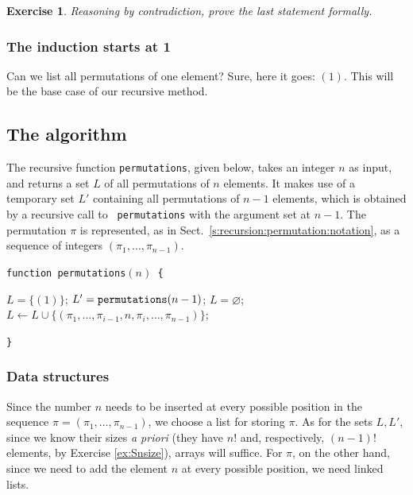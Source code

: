 \documentclass[a4paper]{book}
\theoremstyle{changebreak}                %
\newtheorem{ex}[result]{Exercise}
\begin{document}
\begin{ex}
Reasoning by contradiction, prove the last
statement formally. 
\end{ex}

\subsubsection{The induction starts at 1}
Can we list all permutations of one element? Sure, here it goes:
$(1)$. This will be the base case of our recursive method.

\subsection{The algorithm}
\label{a:permlist}
The recursive function {\tt permutations}, given below, takes an
integer $n$ as input, and returns a set $L$ of all
permutations of $n$ elements. It makes use of a
temporary set $L'$ containing all permutations of $n-1$ elements,
which is obtained by a recursive call to {\tt
  permutations} with the argument set at $n-1$. The permutation $\pi$
is represented, as in Sect.~\ref{s:recursion:permutation:notation}, as a
sequence of integers $(\pi_1,\ldots,\pi_{n-1})$.

\begin{minipage}{10cm}
\begin{flushleft}
{\tt function permutations$(n)$ \{} \\
\begin{algorithmic}[1]
  \STATE $L=\{(1)\}$;
\ELSE
  \STATE $L'=\mbox{\tt permutations}(n-1)$;\label{recstep}
  \STATE $L=\varnothing$;
   \label{for1}
      \STATE
      $L\leftarrow L\cup\{(\pi_1,\ldots,\pi_{i-1},n,\pi_i,\ldots,\pi_{n-1})\}$;   
      \label{mainstep}
    \ENDFOR
  \ENDFOR
\ENDIF
{}\label{retstep}
\end{algorithmic}
\vspace*{-0.1cm}
{\tt \}}
\end{flushleft}
\end{minipage}

\subsubsection{Data structures}
Since the number $n$ needs to be inserted at every possible position
in the sequence $\pi=(\pi_1,\ldots,\pi_{n-1})$, we choose a list for
storing $\pi$. As for the sets $L,L'$, since we know their sizes {\it
  a priori} (they have $n!$ and, respectively, $(n-1)!$ elements, by
Exercise \ref{ex:Snsize}), arrays will suffice. For
$\pi$, on the other hand, since we need to add the element $n$ at
every possible position, we need linked lists.
\end{document}

